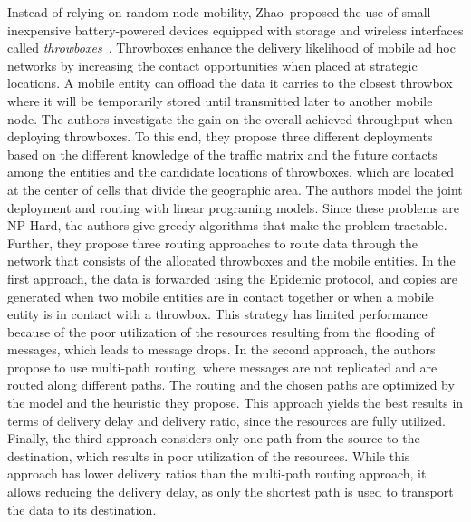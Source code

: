 Instead of relying on random node mobility, Zhao~\etal proposed the use of small inexpensive battery-powered devices equipped with storage and wireless interfaces called \textit{throwboxes}~\cite{zhao2006capacity}. Throwboxes enhance the delivery likelihood of mobile ad hoc networks by increasing the contact opportunities when placed at strategic locations. A mobile entity can offload the data it carries to the closest throwbox where it will be temporarily stored until transmitted later to another mobile node. The authors investigate the gain on the overall achieved throughput when deploying throwboxes. To this end, they propose three different deployments based on the different knowledge of the traffic matrix and the future contacts among the entities and the candidate locations of throwboxes, which are located at the center of cells that divide the geographic area. The authors model the joint deployment and routing with linear programing models. Since these problems are NP-Hard, the authors give greedy algorithms that make the problem tractable. Further, they propose three routing approaches to route data through the network that consists of the allocated throwboxes and the mobile entities. In the first approach, the data is forwarded using the Epidemic protocol, and copies are generated when two mobile entities are in contact together or when a mobile entity is in contact with a throwbox. This strategy has limited performance because of the poor utilization of the resources resulting from the flooding of messages, which leads to message drops. In the second approach, the authors propose to use multi-path routing, where messages are not replicated and are routed along different paths. The routing and the chosen paths are optimized by the model and the heuristic they propose. This approach yields the best results in terms of delivery delay and delivery ratio, since the resources are fully utilized. Finally, the third approach considers only one path from the source to the destination, which results in poor utilization of the resources. While this approach has lower delivery ratios than the multi-path routing approach, it allows reducing the delivery delay, as only the shortest path is used to transport the data to its destination. 

